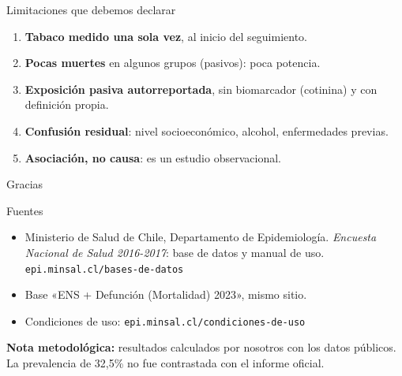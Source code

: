 \documentclass[aspectratio=169,11pt]{beamer}
\begin{document}
\begin{frame}{Limitaciones que debemos declarar}
\begin{enumerate}
  \item \textbf{Tabaco medido una sola vez}, al inicio del seguimiento.
  \item \textbf{Pocas muertes} en algunos grupos (pasivos): poca potencia.
  \item \textbf{Exposición pasiva autorreportada}, sin biomarcador (cotinina) y con definición propia.
  \item \textbf{Confusión residual}: nivel socioeconómico, alcohol, enfermedades previas.
  \item \textbf{Asociación, no causa}: es un estudio observacional.
\end{enumerate}
\end{frame}

{
\begin{frame}[standout]
Gracias
\end{frame}}

\appendix
\begin{frame}{Fuentes}
\small
\begin{itemize}
  \item Ministerio de Salud de Chile, Departamento de Epidemiología. \textit{Encuesta Nacional de Salud 2016-2017}: base de datos y manual de uso. \texttt{epi.minsal.cl/bases-de-datos}
  \item Base «ENS + Defunción (Mortalidad) 2023», mismo sitio.
  \item Condiciones de uso: \texttt{epi.minsal.cl/condiciones-de-uso}
\end{itemize}
\vspace{.5em}
\textbf{Nota metodológica:} resultados calculados por nosotros con los datos públicos. La prevalencia de 32,5\% no fue contrastada con el informe oficial.
\end{frame}
\end{document}
